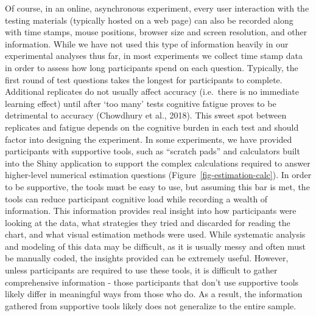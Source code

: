\documentclass[
  10pt,
]{article}
\begin{document}
Of course, in an online, asynchronous experiment, every user interaction
with the testing materials (typically hosted on a web page) can also be
recorded along with time stamps, mouse positions, browser size and
screen resolution, and other information. While we have not used this
type of information heavily in our experimental analyses thus far, in
most experiments we collect time stamp data in order to assess how long
participants spend on each question. Typically, the first round of test
questions takes the longest for participants to complete. Additional
replicates do not usually affect accuracy (i.e.~there is no immediate
learning effect) until after `too many' tests cognitive fatigue proves
to be detrimental to accuracy (Chowdhury et al., 2018). This sweet spot
between replicates and fatigue depends on the cognitive burden in each
test and should factor into designing the experiment. In some
experiments, we have provided participants with supportive tools, such
as ``scratch pads'' and calculators built into the Shiny application to
support the complex calculations required to answer higher-level
numerical estimation questions (Figure~\ref{fig-estimation-calc}). In
order to be supportive, the tools must be easy to use, but assuming this
bar is met, the tools can reduce participant cognitive load while
recording a wealth of information. This information provides real
insight into how participants were looking at the data, what strategies
they tried and discarded for reading the chart, and what visual
estimation methods were used. While systematic analysis and modeling of
this data may be difficult, as it is usually messy and often must be
manually coded, the insights provided can be extremely useful. However,
unless participants are required to use these tools, it is difficult to
gather comprehensive information - those participants that don't use
supportive tools likely differ in meaningful ways from those who do. As
a result, the information gathered from supportive tools likely does not
generalize to the entire sample.
\end{document}

